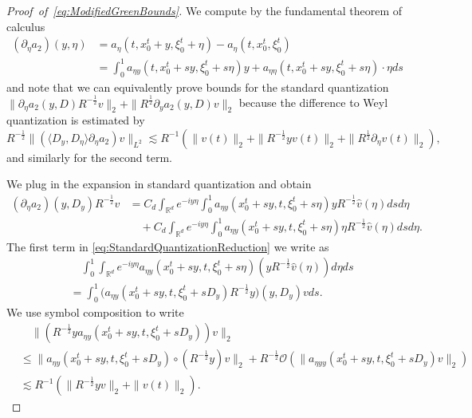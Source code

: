 \documentclass{amsart}
\theoremstyle{definition}
\newcommand{\R}{\mathbb{R}}
\begin{document}
\begin{proof}[Proof~of~\eqref{eq:ModifiedGreenBounds}]
We compute by the fundamental theorem of calculus 
\begin{equation}
\label{eq:SymbolExpansionSecondOrderEta}
\begin{split}
(\partial_{\eta} a_2)(y,\eta) &= a_{\eta}(t,x_0^t + y, \xi_0^t + \eta) - a_{\eta}(t,x_0^t, \xi_0^t) \\
&= \int_0^1 a_{\eta y}(t,x_0^t + sy, \xi_0^t + s \eta) y + a_{\eta \eta}(t,x_0^t + s y, \xi_0^t + s \eta) \cdot \eta ds
\end{split}
\end{equation}
and note that we can equivalently prove bounds for the standard quantization $\| \partial_{\eta} a_2(y,D) R^{-\frac{1}{2}} v \|_2 + \| R^{\frac{1}{2}} \partial_y a_2(y,D) v\|_2$ because the difference to Weyl quantization is estimated by
\begin{equation*}
R^{-\frac{1}{2}} \| (\langle D_y, D_\eta \rangle \partial_{\eta} a_2) v \|_{L^2} 
\lesssim R^{-1} ( \|v(t) \|_2 + \| R^{-\frac{1}{2}} y v(t) \|_2 + \| R^{\frac{1}{2}} \partial_{\eta} v(t) \|_2),
\end{equation*}
and similarly for the second term.

We plug in the expansion in standard quantization and obtain
\begin{equation}
\label{eq:StandardQuantizationReduction}
\begin{split}
(\partial_{\eta} a_2)(y,D_y) R^{-\frac{1}{2}} v &= C_d \int_{\R^d} e^{-i y \eta} \int_0^1 a_{\eta y}(x_0^t + sy,t, \xi_0^t + s \eta) y R^{-\frac{1}{2}} \hat{v}(\eta) ds d\eta \\
&\quad + C_d \int_{\R^d} e^{-i y \eta} \int_0^1 a_{\eta y} (x_0^t + sy,t, \xi_0^t + s \eta) \eta R^{-\frac{1}{2}} \hat{v}(\eta) ds d\eta.
\end{split}
\end{equation}
The first term in \eqref{eq:StandardQuantizationReduction} we write as
\begin{equation*}
\begin{split}
&\quad \int_0^1 \int_{\R^d} e^{-i y \eta} a_{\eta y}(x_0^t + sy,t, \xi_0^t + s \eta) (y R^{-\frac{1}{2}} \hat{v}(\eta)) d\eta ds \\
&= \int_0^1 \big( a_{\eta y}(x_0^t + sy,t, \xi_0^t +sD_y) R^{-\frac{1}{2}} y \big)(y,D_y) v ds.
\end{split}
\end{equation*}
We use symbol composition to write
\begin{equation*}
\begin{split}
&\quad \| ( R^{-\frac{1}{2}} y a_{\eta y}(x_0^t + sy,t,\xi_0^t + s D_y)) v \|_2   \\
&\leq \| a_{\eta y}(x_0^t + s y,t, \xi_0^t + s D_y) \circ (R^{-\frac{1}{2}} y) v \|_2 + R^{-\frac{1}{2}} \mathcal{O}( \| a_{\eta y y }(x_0^t + sy,t,\xi_0^t + s D_y) v \|_2) \\
&\lesssim R^{-1} ( \| R^{-\frac{1}{2}} y v \|_2 + \| v(t) \|_2).
\end{split}
\end{equation*}


\end{proof}
\end{document}
